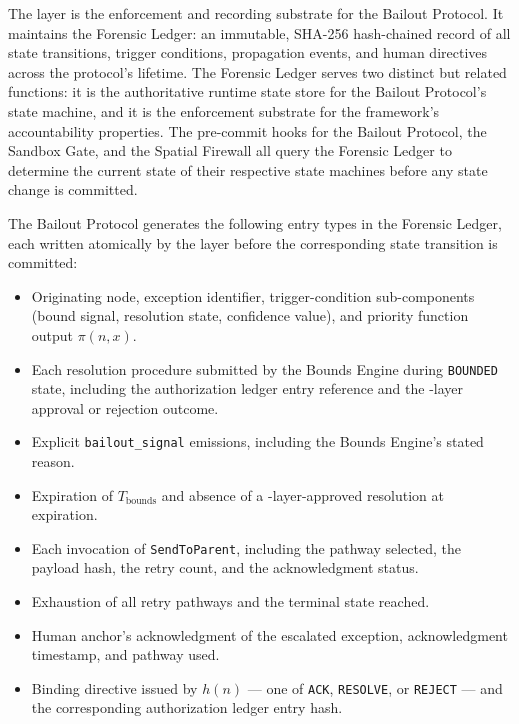 The \fact{} layer is the enforcement and recording substrate for the Bailout
Protocol.  It maintains the Forensic Ledger: an immutable, SHA-256
hash-chained record of all state transitions, trigger conditions, propagation
events, and human directives across the protocol's lifetime.  The Forensic
Ledger serves two distinct but related functions: it is the authoritative
runtime state store for the Bailout Protocol's state machine, and it is the
enforcement substrate for the framework's accountability properties.  The
pre-commit hooks for the Bailout Protocol, the Sandbox Gate, and the Spatial
Firewall all query the Forensic Ledger to determine the current state of
their respective state machines before any state change is committed.

The Bailout Protocol generates the following entry types in the Forensic
Ledger, each written atomically by the \fact{} layer before the corresponding
state transition is committed:

\begin{itemize}\itemsep=0pt
\item[\texttt{bailout-trigger}] Originating node, exception identifier,
  trigger-condition sub-components (bound signal, resolution state,
  confidence value), and priority function output $\pi(n, x)$.
\item[\texttt{bounds-resolution-attempt}] Each resolution procedure submitted
  by the Bounds Engine during \texttt{BOUNDED} state, including the
  authorization ledger entry reference and the \fact{}-layer approval or
  rejection outcome.
\item[\texttt{bailout-signal}] Explicit \texttt{bailout\_signal} emissions,
  including the Bounds Engine's stated reason.
\item[\texttt{timeout-bounds-expired}] Expiration of $T_{\text{bounds}}$ and
  absence of a \fact{}-layer-approved resolution at expiration.
\item[\texttt{escalation-sent}] Each invocation of \texttt{SendToParent},
  including the pathway selected, the payload hash, the retry count, and the
  acknowledgment status.
\item[\texttt{pathway-exhausted}] Exhaustion of all retry pathways and the
  terminal state reached.
\item[\texttt{human-ack}] Human anchor's acknowledgment of the escalated
  exception, acknowledgment timestamp, and pathway used.
\item[\texttt{human-directive}] Binding directive issued by $h(n)$ --- one of
  \texttt{ACK}, \texttt{RESOLVE}, or \texttt{REJECT} --- and the
  corresponding authorization ledger entry hash.
\end{itemize}

